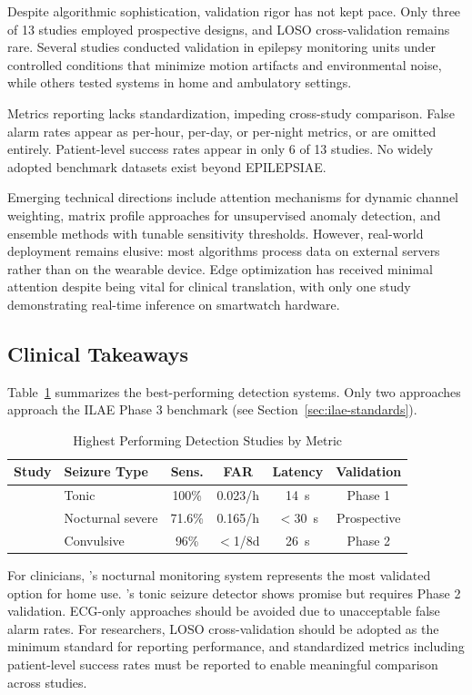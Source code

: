 Despite algorithmic sophistication, validation rigor has not kept pace. Only three of 13 studies employed prospective designs, and LOSO cross-validation remains rare. Several studies conducted validation in epilepsy monitoring units under controlled conditions that minimize motion artifacts and environmental noise, while others tested systems in home and ambulatory settings.

Metrics reporting lacks standardization, impeding cross-study comparison. False alarm rates appear as per-hour, per-day, or per-night metrics, or are omitted entirely. Patient-level success rates appear in only 6 of 13 studies. No widely adopted benchmark datasets exist beyond EPILEPSIAE.

Emerging technical directions include attention mechanisms for dynamic channel weighting, matrix profile approaches for unsupervised anomaly detection, and ensemble methods with tunable sensitivity thresholds. However, real-world deployment remains elusive: most algorithms process data on external servers rather than on the wearable device. Edge optimization has received minimal attention despite being vital for clinical translation, with only one study demonstrating real-time inference on smartwatch hardware.

\subsection{Clinical Takeaways}

Table~\ref{tab:detection-performance} summarizes the best-performing detection systems. Only two approaches approach the ILAE Phase 3 benchmark (see Section~\ref{sec:ilae-standards}).

\begin{table}[htbp]
\centering
\small
\caption{Highest Performing Detection Studies by Metric}
\label{tab:detection-performance}
\begin{tabular}{llcccc}
\toprule
\textbf{Study} & \textbf{Seizure Type} & \textbf{Sens.} & \textbf{FAR} & \textbf{Latency} & \textbf{Validation} \\
\midrule
\parencite{fineDetectionKeyAutomated2025} & Tonic & 100\% & 0.023/h & 14~s & Phase 1 \\
\parencite{dongDetectionNocturnalEpileptic2026} & Nocturnal severe & 71.6\% & 0.165/h & $<$30~s & Prospective \\
\parencite{spahrDeepLearningbasedDetection2025} & Convulsive & 96\% & $<$1/8d & 26~s & Phase 2 \\
\bottomrule
\end{tabular}
\end{table}

\noindent For clinicians, \parencite{dongDetectionNocturnalEpileptic2026}'s nocturnal monitoring system represents the most validated option for home use. \parencite{fineDetectionKeyAutomated2025}'s tonic seizure detector shows promise but requires Phase 2 validation. ECG-only approaches should be avoided due to unacceptable false alarm rates. For researchers, LOSO cross-validation should be adopted as the minimum standard for reporting performance, and standardized metrics including patient-level success rates must be reported to enable meaningful comparison across studies.
